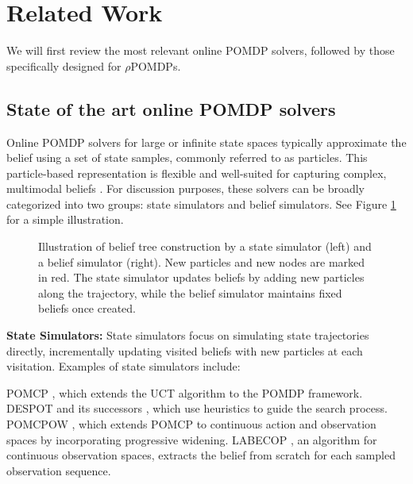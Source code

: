 \section{Related Work}
We will first review the most relevant online POMDP solvers, followed by those specifically designed for $\rho$POMDPs.
	\subsection{State of the art online POMDP solvers}

		Online POMDP solvers for large or infinite state spaces typically approximate the belief using a set of state samples, commonly referred to as particles. 
		This particle-based representation is flexible and well-suited for capturing complex, multimodal beliefs \cite{Thrun05book}.
		For discussion purposes, these solvers can be broadly categorized into two groups: state simulators and belief simulators.
		See Figure \ref{fig:trees} for a simple illustration.

		\begin{figure}[tb]
			\centering
			
			\caption{Illustration of belief tree construction by a state simulator (left) and a belief simulator (right). New particles and new nodes are marked in red. The state simulator updates beliefs by adding new particles along the trajectory, while the belief simulator maintains fixed beliefs once created.}
			\label{fig:trees}
		\end{figure}


		\textbf{State Simulators:}
		State simulators focus on simulating state trajectories directly, incrementally updating visited beliefs with new particles at each visitation.
		Examples of state simulators include:
  
		POMCP \cite{Silver10nips}, which extends the UCT algorithm \cite{Kocsis06ecml} to the POMDP framework.  
		DESPOT \cite{Somani13nips} and its successors \cite{Ye17jair,Garg19rss}, which use heuristics to guide the search process.  
		POMCPOW \cite{Sunberg18icaps}, which extends POMCP to continuous action and observation spaces by incorporating progressive widening.  
		LABECOP \cite{Hoerger21icra}, an algorithm for continuous observation spaces, extracts the belief from scratch for each sampled observation sequence.

